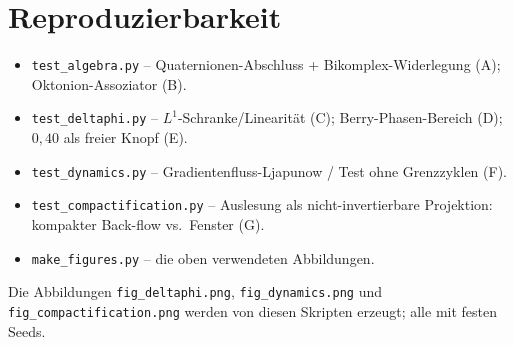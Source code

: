 \section{Reproduzierbarkeit}
\begin{itemize}
\item \texttt{test\_algebra.py} -- Quaternionen-Abschluss + Bikomplex-Widerlegung (A); Oktonion-Assoziator (B).
\item \texttt{test\_deltaphi.py} -- $L^1$-Schranke/Linearität (C); Berry-Phasen-Bereich (D); $0{,}40$ als freier Knopf (E).
\item \texttt{test\_dynamics.py} -- Gradientenfluss-Ljapunow / Test ohne Grenzzyklen (F).
\item \texttt{test\_compactification.py} -- Auslesung als nicht-invertierbare Projektion: kompakter Back-flow vs.\ Fenster (G).
\item \texttt{make\_figures.py} -- die oben verwendeten Abbildungen.
\end{itemize}
Die Abbildungen \texttt{fig\_deltaphi.png}, \texttt{fig\_dynamics.png} und
\texttt{fig\_compactification.png} werden von diesen Skripten erzeugt; alle mit festen Seeds.
